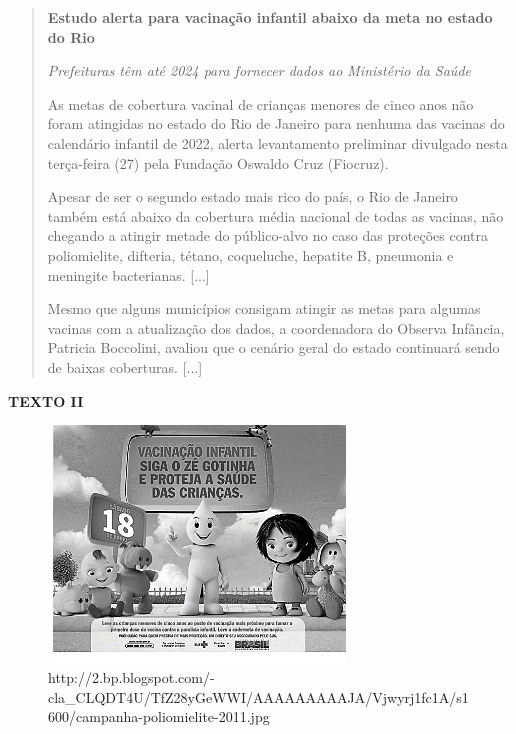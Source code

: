 \begin{quote}
\textbf{Estudo alerta para vacinação infantil abaixo da meta no estado
do Rio}

\emph{Prefeituras têm até 2024 para fornecer dados ao Ministério da
Saúde}

As metas de cobertura vacinal de crianças menores de cinco anos não
foram atingidas no estado do Rio de Janeiro para nenhuma das vacinas do
calendário infantil de 2022, alerta levantamento preliminar divulgado
nesta terça-feira (27) pela Fundação Oswaldo Cruz (Fiocruz).

Apesar de ser o segundo estado mais rico do país, o Rio de Janeiro
também está abaixo da cobertura média nacional de todas as vacinas, não
chegando a atingir metade do público-alvo no caso das proteções contra
poliomielite, difteria, tétano, coqueluche, hepatite B, pneumonia e
meningite bacterianas. {[}...{]}

Mesmo que alguns municípios consigam atingir as metas para algumas
vacinas com a atualização dos dados, a coordenadora do Observa Infância,
Patricia Boccolini, avaliou que o cenário geral do estado continuará
sendo de baixas coberturas. {[}...{]}

\end{quote}

\textbf{TEXTO II}

\begin{figure}
\centering
\includegraphics[width=3.15625in,height=2.48418in]{./imgSAEB_8_POR/media/image32.png}
\caption{http://2.bp.blogspot.com/-cla\_CLQDT4U/TfZ28yGeWWI/AAAAAAAAAJA/Vjwyrj1fc1A/s1600/campanha-poliomielite-2011.jpg}
\end{figure}

